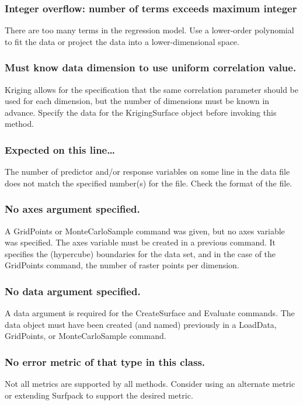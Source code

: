 \documentclass{article}
\begin{document}
\subsubsection{Integer overflow: number of terms exceeds maximum integer}
There are too many terms in the regression model.  Use a lower-order polynomial to fit the data or project the data into a lower-dimensional space.

\subsubsection{Must know data dimension to use uniform correlation value.}
Kriging allows for the specification that the same correlation parameter should be used for each dimension, but the number of dimensions must be known in advance.  Specify the data for the KrigingSurface object before invoking this method.

\subsubsection{Expected on this line\ldots}
The number of predictor and/or response variables on some line in the data file does not match the specified number(s) for the file.  Check the format of the file.

\subsubsection{No axes argument specified.}
A GridPoints or MonteCarloSample command was given, but no axes variable was specified.  The axes variable must be created in a previous command.  It specifies the (hypercube) boundaries for the data set, and in the case of the GridPoints command, the number of raster points per dimension.

\subsubsection{No data argument specified.}
A data argument is required for the CreateSurface and Evaluate commands.  The data object must have been created (and named) previously in a LoadData, GridPoints, or MonteCarloSample command.

\subsubsection{No error metric of that type in this class.}
Not all metrics are supported by all methods.  Consider using an alternate metric or extending Surfpack to support the desired metric.
\end{document}
